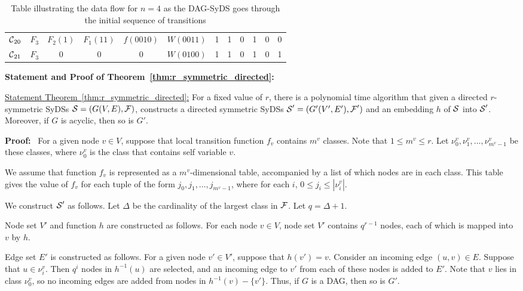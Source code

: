 \begin{table*}
\begin{center}
\begin{tabular}{|l | c c c c c c c c c c c |}
$\mbox{$\mathcal{C}$}_{20}$ & $F_3$ & $F_2(1)$ & $F_1(11)$ & $f(0010)$ & $W(0011)$ & 1 & 1 & 0 & 1 & 0 & 0 \\ 
$\mbox{$\mathcal{C}$}_{21}$ & $F_3$ & 0 & 0 & 0 & $W(0100)$ & 1 & 1 & 0 & 1 & 0 & 1 \\ \hline
\end{tabular}
\end{center}
\caption{Table illustrating the data flow for $n = 4$ 
as the DAG-SyDS \cals{} goes through the initial sequence of transitions}
\label{tab:dag_syds_trans}
\end{table*}

\medskip

\noindent
\textbf{Statement and Proof of Theorem~\ref{thm:r_symmetric_directed}:}

\medskip

\noindent
\underline{Statement Theorem~\ref{thm:r_symmetric_directed}:}
For a fixed value of $r$, there is a polynomial time algorithm that
given a directed $r$-symmetric SyDSs $\mbox{$\mathcal{S}$} = (G(V,E), \mbox{$\mathcal{F}$})$,
constructs a directed symmetric SyDSs $\mbox{$\mathcal{S}$}' = (G'(V',E'), \mbox{$\mathcal{F}$}')$
and an embedding $h$ of $\mbox{$\mathcal{S}$}$ into $\mbox{$\mathcal{S}$}'$.  Moreover, if  $G$
is acyclic, then so is $G'$.  

\medskip

\noindent
\textbf{Proof:}~ 
For a given node $v \in V$, 
suppose that local transition function $f_v$ contains $m^v$ classes.
Note that $1 \leq m^v \leq r$.
Let $\nu_0^v, \nu_1^v, \ldots ,\nu_{m^v-1}^v$ be these classes,
where $\nu_0^v$ is the class that contains self variable $v$.

We assume that function $f_v$  is represented 
as a $m^v$-dimensional table,
accompanied by a list of which nodes are in each class.
This table gives the value of $f_v$ for each tuple
of the form $j_0,  j_1, \ldots , j_{m^v -1}$,
where for each $i$, $0 \leq j_i \leq |\nu_i^v|$.

We construct $\mbox{$\mathcal{S}$}'$ as follows.
Let $\Delta$ be the cardinality of the largest class in $\mbox{$\mathcal{F}$}$.
Let $q =  \Delta + 1$.

Node set $V'$ and function $h$ are constructed as follows.
For each node $v \in V$,
node set $V'$ contains $q^{r-1}$ nodes, each of which is mapped into $v$ by $h$.

 Edge set $E'$ is constructed as follows.
For a given node $v' \in V'$,
suppose that $h(v') = v$.
Consider an incoming edge $(u,v) \in E$.
Suppose that $u \in \nu_i^v$.
Then $q^i$ nodes in $h^{-1}(u)$ are selected,
and an incoming edge to $v'$ from each of these nodes is added to $E'$.
Note that $v$  lies in class  $\nu_0^v$,
so no incoming edges are added from nodes in $h^{-1}(v) - \{v'\}$.
Thus, if $G$ is a DAG, then so is $G'$.

